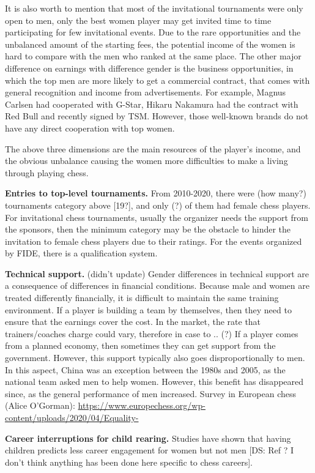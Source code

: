 It is also worth to mention that most of the invitational tournaments were only open to men, only the best women player may get invited time to time participating for few invitational events. Due to the rare opportunities and the unbalanced amount of the starting fees, the potential income of the women is hard to compare with the men who ranked at the same place.
The other major difference on earnings with difference gender is the business opportunities, in which the top men are more likely to get a commercial contract, that comes with general recognition and income from advertisements. For example, Magnus Carlsen had cooperated with G-Star, Hikaru Nakamura had the contract with Red Bull and recently signed by TSM. However, those well-known brands do not have any direct cooperation with top women.

The above three dimensions are the main resources of the player’s income, and the obvious unbalance causing the women more difficulties to make a living through playing chess.

{\bf Entries to top-level tournaments.}
From 2010-2020, there were (how many?) tournaments category above [19?], and only (?) of them had female chess players.
For invitational chess tournaments, usually the organizer needs the support from the sponsors, then the minimum category may be the obstacle to hinder the invitation to female chess players due to their ratings.
For the events organized by FIDE, there is a qualification system.

{\bf Technical support.} (didn’t update) Gender differences in technical support are a consequence of differences in financial conditions. Because male and women are treated differently financially, it is difficult to maintain the same training environment. If a player is building a team by themselves, then they need to ensure that the earnings cover the cost. In the market, the rate that trainers/coaches charge could vary, therefore in case to .. (?) If a player comes from a planned economy, then sometimes they can get support from the government. However, this support typically also goes disproportionally to men. In this aspect, China was an exception between the 1980s and 2005, as the national team asked men to help women. However, this benefit has disappeared since, as the general performance of men increased.
Survey in European chess (Alice O'Gorman): \url{https://www.europechess.org/wp-content/uploads/2020/04/Equality-}

{\bf Career interruptions for child rearing.} Studies have shown that having children predicts less career engagement for women but not men [DS: Ref ? I don't think anything has been done here specific to chess careers].


